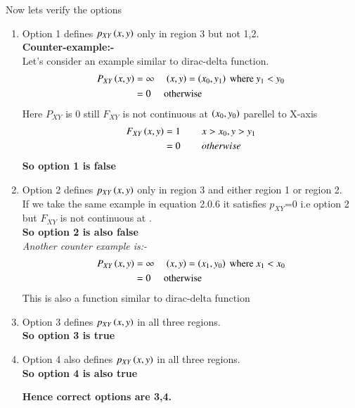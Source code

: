 \documentclass[journal,12pt,twocolumn]{IEEEtran}
\begin{document}
Now lets verify the options
\begin{enumerate}
\item Option 1 defines $p_{XY}\left(x,y\right)$ only in region 3 but not 1,2.\\
\textbf{Counter-example:-}\\
Let's consider an example similar to dirac-delta function.
\begin{align}
P_{XY}\left(x,y\right)&=\infty \hspace{0.15in} \left(x,y\right)=\left(x_0,y_1\right)\text{ where }y_1<y_0  \nonumber \\
&=0 \hspace{0.15in} \text{ otherwise}
\end{align}
Here $P_{XY}$ is 0 still $F_{XY}$ is not continuous at $\left(x_0,y_0\right)$ parellel to X-axis
\begin{align}
F_{XY}\left(x,y\right)&=1 \hspace{0.3in} x>x_0,y>y_1 \nonumber\\
&=0 \hspace{0.3in} otherwise
\end{align}
\textbf{So option 1 is false}
\item Option 2 defines $p_{XY}\left(x,y\right)$ only in region 3 and either region 1 or region 2.\\
If we take the same example in equation 2.0.6 it satisfies $p_{XY}$=0 i.e option 2 but $F_{XY}$ is not continuous at .\\
\textbf{So option 2 is also false}\\
\textit{Another counter example is:-}
\begin{align}
P_{XY}\left(x,y\right)&=\infty \hspace{0.15in} \left(x,y\right)=\left(x_1,y_0\right)\text{ where }x_1<x_0  \nonumber \\
&=0 \hspace{0.15in} \text{ otherwise}
\end{align}
This is also a function similar to dirac-delta function
\item Option 3 defines $p_{XY}\left(x,y\right)$ in all three regions.\\
\textbf{So option 3 is true}
\item Option 4 also defines $p_{XY}\left(x,y\right)$ in all three regions.\\
\textbf{So option 4 is also true}
\begin{center}
\textbf{Hence correct options are 3,4.}
\end{center}
\end{enumerate}
\end{document}
